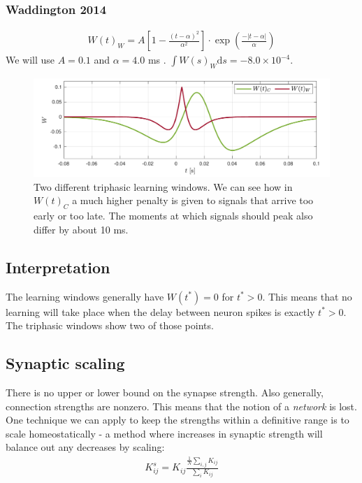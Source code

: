 \subsubsection{Waddington 2014}
\begin{align}
W(t)_W =  A \left[1-\frac{\left(t-\alpha\right)^{2}}{\alpha^{2}}\right] \cdot \exp \left(\frac{-\left|t - \alpha\right|}{\alpha}\right) \label{eq:learningwindowWaddington2014}
\end{align}
We will use $A = 0.1$ and $\alpha = 4.0$ ms . $\int W(s)_W \mathrm{d}s = -8.0 \times 10^{-4}$.

\begin{figure}[H]
\centering
\includegraphics[width = \textwidth]{../Figures/LearningWindowsTriphasic.pdf}
\caption{Two different triphasic learning windows. We can see how in $W(t)_C$  a much higher penalty is given to signals that arrive too early or too late. The moments at which signals should peak also differ by about 10 ms.}
\label{fig:LearningWindowsTriphasic.pdf}
\end{figure}


\subsection{Interpretation}
The learning windows generally have $W(t^{\ast}) = 0$ for $t^{\ast} > 0$. This means that no learning will take place when the delay between neuron spikes is exactly $t^{\ast} > 0$. The triphasic windows show two of those points.


\subsection{Synaptic scaling}
There is no upper or lower bound on the synapse strength. Also generally, connection strengths are nonzero. This means that the notion of a \textsl{network} is lost.\\
One technique we can apply to keep the strengths within a definitive range is to scale homeostatically - a method where increases in synaptic strength will balance out any decreases by scaling:
\begin{align}
K_{ij}^s = K_{ij} \frac{\frac{1}{N} \sum_{i,j} K_{ij}}{\sum_{i} K_{ij}}
\end{align}


